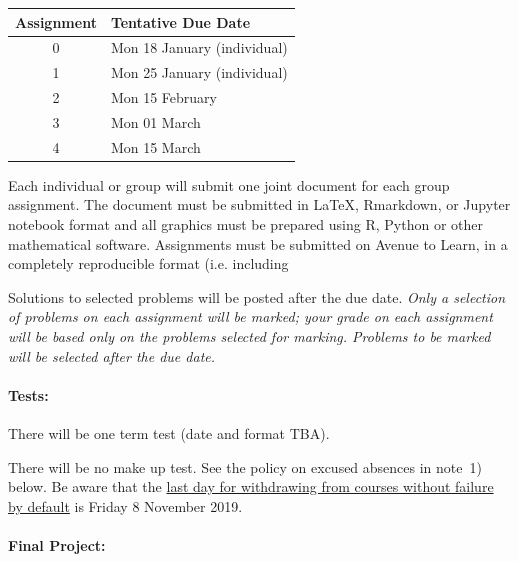 \documentclass[12pt]{article}
\newcommand{\note}{\noindent{\bfseries\slshape Note:\/} }
\begin{document}
\begin{center}
\begin{tabular}{c|l}
\bf Assignment & \bf Tentative Due Date \\\hline
0 & Mon 18 January (individual) \\  
1 & Mon 25 January (individual) \\
2 & Mon 15 February \\
3 & Mon 01 March \\
4 & Mon 15 March \\
\end{tabular}


\noindent
Each individual or group will submit one joint document for each group assignment.  The
document must be submitted in \LaTeX, Rmarkdown, or Jupyter notebook format and all graphics must be prepared
using R, Python or other mathematical software.  Assignments must be submitted on Avenue to Learn, in a completely
reproducible format (i.e. including

Solutions to selected problems will be posted after the due date.
\note \emph{Only a selection of problems on each assignment will be marked; your grade on each assignment will be based only on the problems selected for marking.  Problems to be marked will be selected after the due date.}



\paragraph*{Tests:}

There will be one term test (date and format TBA).

There will be no make up test. See the policy on excused absences in
note~1) below.  Be aware that the
\href{https://academiccalendars.romcmaster.ca/content.php?catoid=38&navoid=8059}{last
  day for withdrawing from courses without failure by default} is
Friday 8 November 2019.

\paragraph*{Final Project:}


\end{center}
\end{document}
